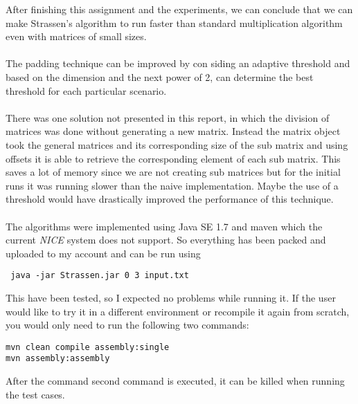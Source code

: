 \documentclass[tikz, 12pt]{scrartcl}
\begin{document}
After finishing this assignment and the experiments, we can conclude that we can make Strassen's algorithm to run faster than standard multiplication algorithm even with matrices of small sizes.\\
\\
The padding technique can be improved by con siding an adaptive threshold and based on the dimension and the next power of 2, can determine the best threshold for each particular scenario.\\
\\
There was one solution not presented in this report, in which the division of matrices was done without generating a new matrix. Instead the matrix object took the general matrices and its corresponding size of the sub matrix and using offsets it is able to retrieve the corresponding element of each sub matrix. This saves a lot of memory since we are not creating sub matrices but for the initial runs it was running slower than the naive implementation. Maybe the use of a threshold would have drastically improved the performance of this technique.\\
\\
The algorithms were implemented using Java SE 1.7 and maven which the current \textit{NICE} system does not support. So everything has been packed and uploaded to my account and can be run using
\begin{verbatim}
 java -jar Strassen.jar 0 3 input.txt 
\end{verbatim}
This have been tested, so I expected no problems while running it. If the user would like to try it in a different environment or recompile it again from scratch, you would only need to run the following two commands:

\begin{verbatim}
mvn clean compile assembly:single
mvn assembly:assembly
\end{verbatim}

After the command second command is executed, it can be killed when running the test cases.
\end{document}
